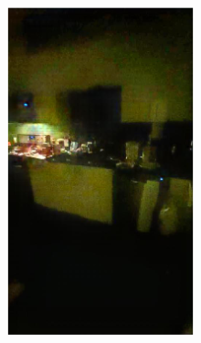 \documentclass[letterpaper,12pt]{article}
\begin{document}
\begin{figure}[htbp]
\begin{subfigure}{0.128\textwidth}
			\includegraphics[width=\linewidth]{LoLi-Phone-imgT/DSLR}
			\captionsetup{font=scriptsize}
			\caption{}
			\label{fig: LoLi-Phone-imgT_i}  
		\end{subfigure}
		\begin{subfigure}{0.128\textwidth}

\end{subfigure}
\end{figure}
\end{document}
